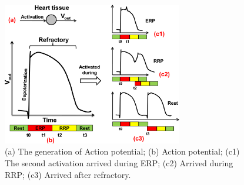 



\begin{figure}[!t]
\center
\includegraphics[width=0.7\textwidth]{figs/refractory.png}
\caption{(a) The generation of Action potential; (b) Action potential; (c1) The second activation arrived during ERP; (c2) Arrived during RRP; (c3) Arrived after refractory.}
\label{fig:refractory}
\end{figure} 
